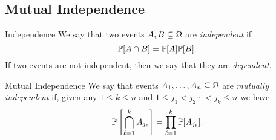 \documentclass[class=article, crop=false]{standalone}
\begin{document}
  \subsection{Mutual Independence}
  \begin{definition}{Independence}
    We say that two events $A, B\sse\Omega$ are \emph{independent} if
    \[
      \P[A\cap B] = \P[A]\P[B].
    \]
    If two events are not independent, then we say that they are \emph{dependent}.
  \end{definition}
  \begin{definition}{Mutual Independence}
    We say that events $A_1,\dotsc,A_n\sse\Omega$ are \emph{mutually independent} if, given any $1\leq k\leq n$ and $1\leq j_1 < j_2 \dotsb < j_k\leq n$ we have
    \[
      \P\left[\bigcap_{\ell = 1}^k A_{j_\ell}\right] = \prod_{\ell = 1}^k\P[A_{j_\ell}].
    \]
  \end{definition}
\end{document}
